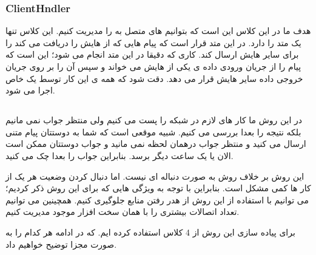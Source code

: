 	\subsubsection{ClientHndler}
	هدف ما در این کلاس این است که بتوانیم 
	های متصل به 
	را مدیریت کنیم. این کلاس تنها یک متد 
	را دارد. در این متد قرار است که 
	پیام هایی که از 
	هایش را دریافت می کند را برای سایر 
	هایش ارسال کند. کاری که دقیقا در این متد انجام می شود؛ این است که پیام را از جریان ورودی داده ی یکی از 
	هایش  می خواند و سپس آن را بر روی جریان خروجی داده سایر 
	هایش قرار می دهد. دقت شود که همه ی این کار توسط یک 
	خاص اجرا می شود.


\subsection{}
در این روش ما کار های لازم در شبکه را پست می کنیم ولی منتظر جواب نمی مانیم بلکه نتیجه را بعدا بررسی می کنیم. شبیه موقعی است که شما به دوستتان پیام متنی ارسال می کنید و منتظر جواب درهمان لحظه نمی مانید و جواب دوستتان ممکن است الان یا یک ساعت دیگر برسد. بنابراین جواب را بعدا چک می کنید. 

این روش بر خلاف روش 
به صورت دنباله ای نیست. اما دنبال کردن وضعیت هر یک از کار ها کمی مشکل است.
بنابراین با توجه به ویژگی هایی که برای این روش ذکر کردیم؛ می توانیم با استفاده از این روش از هدر رفتن منابع جلوگیری کنیم. همچینین می توانیم تعداد اتصالات بیشتری را با همان سخت افزار موجود مدیریت کنیم.

برای پیاده سازی این روش از 4 کلاس استفاده کرده ایم. که در ادامه هر کدام را به صورت مجزا توضیح خواهیم داد.
